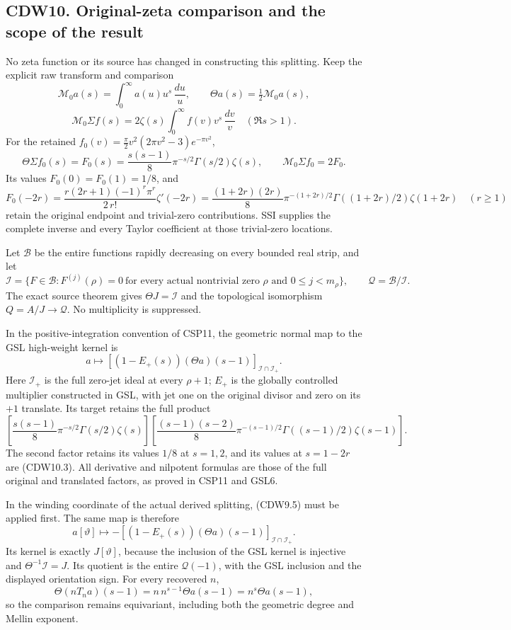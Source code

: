 \subsection{CDW10. Original-zeta comparison and the scope of the
result}\label{cdw10.-original-zeta-comparison-and-the-scope-of-the-result}

No zeta function or its source has changed in constructing this
splitting. Keep the explicit raw transform and comparison \[
\mathcal M_0a(s)=\int_0^\infty a(u)u^s\,\frac{du}{u},
\qquad\Theta a(s)=\tfrac12\mathcal M_0a(s),
\] \[
\mathcal M_0\Sigma f(s)
=2\zeta(s)\int_0^\infty f(v)v^s\,\frac{dv}{v}
\quad(\Re s>1).
\tag{CDW10.1}
\] For the retained \(f_0(v)=\frac{\pi}{2}v^2(2\pi v^2-3)e^{-\pi v^2}\),
\[
\Theta\Sigma f_0(s)=F_0(s)
=\frac{s(s-1)}8\pi^{-s/2}\Gamma(s/2)\zeta(s),
\qquad \mathcal M_0\Sigma f_0=2F_0.
\tag{CDW10.2}
\] Its values \(F_0(0)=F_0(1)=1/8\), and \[
F_0(-2r)=
\frac{r(2r+1)(-1)^r\pi^r}{2\,r!}\zeta'(-2r)
=\frac{(1+2r)(2r)}8\pi^{-(1+2r)/2}
\Gamma((1+2r)/2)\zeta(1+2r)
\quad(r\ge1)
\tag{CDW10.3}
\] retain the original endpoint and trivial-zero contributions. SSI
supplies the complete inverse and every Taylor coefficient at those
trivial-zero locations.

Let \(\mathcal B\) be the entire functions rapidly decreasing on every
bounded real strip, and let \[
\mathcal I=\{F\in\mathcal B:
F^{(j)}(\rho)=0\ \text{for every actual nontrivial zero }\rho
\text{ and }0\le j<m_\rho\},\qquad
\mathcal Q=\mathcal B/\mathcal I.
\tag{CDW10.4}
\] The exact source theorem gives \(\Theta J=\mathcal I\) and the
topological isomorphism \(Q=A/J\to\mathcal Q\). No multiplicity is
suppressed.

In the positive-integration convention of CSP11, the geometric normal
map to the GSL high-weight kernel is \[
a\longmapsto
[(1-E_+(s))(\Theta a)(s-1)]_{\mathcal I\cap\mathcal I_+}.
\tag{CDW10.5}
\] Here \(\mathcal I_+\) is the full zero-jet ideal at every \(\rho+1\);
\(E_+\) is the globally controlled multiplier constructed in GSL, with
jet one on the original divisor and zero on its \(+1\) translate. Its
target retains the full product \[
\left[\frac{s(s-1)}8\pi^{-s/2}\Gamma(s/2)\zeta(s)\right]
\left[\frac{(s-1)(s-2)}8\pi^{-(s-1)/2}
\Gamma((s-1)/2)\zeta(s-1)\right].
\tag{CDW10.6}
\] The second factor retains its values \(1/8\) at \(s=1,2\), and its
values at \(s=1-2r\) are (CDW10.3). All derivative and nilpotent
formulas are those of the full original and translated factors, as
proved in CSP11 and GSL6.

In the winding coordinate of the actual derived splitting, (CDW9.5) must
be applied first. The same map is therefore \[
\boxed{
a[\vartheta]\longmapsto
-[(1-E_+(s))(\Theta a)(s-1)]_{\mathcal I\cap\mathcal I_+}.}
\tag{CDW10.7}
\] Its kernel is exactly \(J[\vartheta]\), because the inclusion of the
GSL kernel is injective and \(\Theta^{-1}\mathcal I=J\). Its quotient is
the entire \(\mathcal Q(-1)\), with the GSL inclusion and the displayed
orientation sign. For every recovered \(n\), \[
\Theta(nT_na)(s-1)
=n\,n^{s-1}\Theta a(s-1)=n^s\Theta a(s-1),
\tag{CDW10.8}
\] so the comparison remains equivariant, including both the geometric
degree and Mellin exponent.


